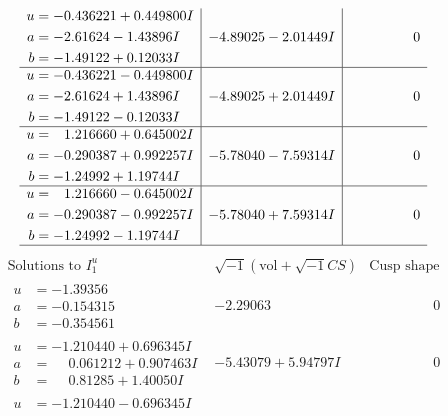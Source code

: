 \documentclass[1p]{elsarticle_modified}
\theoremstyle{definition}
\newcommand{\I}{\sqrt{-1}}
\begin{document}
$$\begin{array}{c|c|c}
\begin{aligned}
u &= -0.436221 + 0.449800 I \\
a &= -2.61624 - 1.43896 I \\
b &= -1.49122 + 0.12033 I\end{aligned}
 & -4.89025 - 2.01449 I & \phantom{-0.000000 } 0 \\ \hline\begin{aligned}
u &= -0.436221 - 0.449800 I \\
a &= -2.61624 + 1.43896 I \\
b &= -1.49122 - 0.12033 I\end{aligned}
 & -4.89025 + 2.01449 I & \phantom{-0.000000 } 0 \\ \hline\begin{aligned}
u &= \phantom{-}1.216660 + 0.645002 I \\
a &= -0.290387 + 0.992257 I \\
b &= -1.24992 + 1.19744 I\end{aligned}
 & -5.78040 - 7.59314 I & \phantom{-0.000000 } 0 \\ \hline\begin{aligned}
u &= \phantom{-}1.216660 - 0.645002 I \\
a &= -0.290387 - 0.992257 I \\
b &= -1.24992 - 1.19744 I\end{aligned}
 & -5.78040 + 7.59314 I & \phantom{-0.000000 } 0\\
 \hline 
 \end{array}$$\newpage$$\begin{array}{c|c|c}  
\text{Solutions to }I^u_{1}& \I (\text{vol} + \sqrt{-1}CS) & \text{Cusp shape}\\
 \hline 
\begin{aligned}
u &= -1.39356\phantom{ +0.000000I} \\
a &= -0.154315\phantom{ +0.000000I} \\
b &= -0.354561\phantom{ +0.000000I}\end{aligned}
 & -2.29063\phantom{ +0.000000I} & \phantom{-0.000000 } 0 \\ \hline\begin{aligned}
u &= -1.210440 + 0.696345 I \\
a &= \phantom{-}0.061212 + 0.907463 I \\
b &= \phantom{-}0.81285 + 1.40050 I\end{aligned}
 & -5.43079 + 5.94797 I & \phantom{-0.000000 } 0 \\ \hline\begin{aligned}
u &= -1.210440 - 0.696345 I \\

\end{aligned}
\end{array}$$
\end{document}
